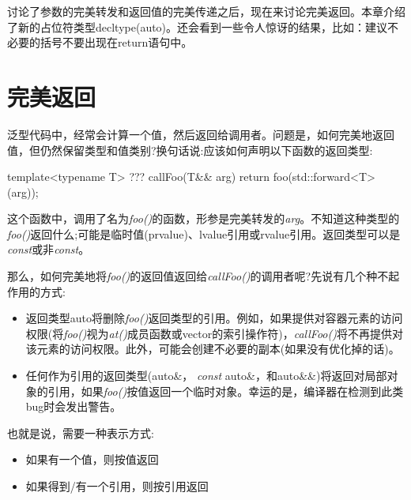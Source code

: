 
讨论了参数的完美转发和返回值的完美传递之后，现在来讨论完美返回。本章介绍了新的占位符类型decltype(auto)。还会看到一些令人惊讶的结果，比如：建议不必要的括号不要出现在return语句中。\par


\section{完美返回}

泛型代码中，经常会计算一个值，然后返回给调用者。问题是，如何完美地返回值，但仍然保留类型和值类别?换句话说:应该如何声明以下函数的返回类型:\par

\begin{codebox}[cpp]
template<typename T>
??? callFoo(T&& arg)
{
  return foo(std::forward<T>(arg));
}
\end{codebox}

这个函数中，调用了名为\textit{foo()}的函数，形参是完美转发的\textit{arg}。不知道这种类型的\textit{foo()}返回什么;可能是临时值(prvalue)、lvalue引用或rvalue引用。返回类型可以是\textit{const}或非\textit{const}。\par

那么，如何完美地将\textit{foo()}的返回值返回给\textit{callFoo()}的调用者呢?先说有几个种不起作用的方式:\par

\begin{itemize}
  \item 返回类型auto将删除\textit{foo()}返回类型的引用。例如，如果提供对容器元素的访问权限(将\textit{foo()}视为\textit{at()}成员函数或vector的索引操作符)，\textit{callFoo()}将不再提供对该元素的访问权限。此外，可能会创建不必要的副本(如果没有优化掉的话)。
  \item 任何作为引用的返回类型(auto\&， \textit{const} auto\&，和auto\&\&)将返回对局部对象的引用，如果\textit{foo()}按值返回一个临时对象。幸运的是，编译器在检测到此类bug时会发出警告。
\end{itemize}

也就是说，需要一种表示方式:\par

\begin{itemize}
  \item 如果有一个值，则按值返回
  \item 如果得到/有一个引用，则按引用返回
\end{itemize}

